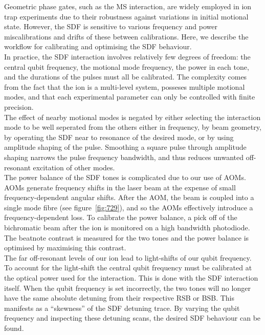     Geometric phase gates, such as the MS interaction, are widely employed in ion trap experiments due to their robustness against variations in initial motional state. However, the SDF is sensitive to various frequency and power miscalibrations and drifts of these between calibrations.  Here, we describe the workflow for calibrating and optimising the SDF behaviour.\\
    In practice, the SDF interaction involves relatively few degrees of freedom: the central qubit frequency, the motional mode frequency, the power in each tone, and the durations of the pulses must all be calibrated. The complexity comes from the fact that the ion is a multi-level system, posseses multiple motional modes, and that each experimental parameter can only be controlled with finite precision.\\
    The effect of nearby motional modes is negated by either selecting the
    interaction mode to be well seperated from the others either in frequency, by beam geometry, by
    operating the SDF near to resonance of the desired mode, or by using amplitude shaping of the pulse.
    Smoothing a square pulse through amplitude shaping narrows the pulse frequency bandwidth, and thus reduces unwanted off-resonant
    excitation of other modes.  \\
    The power balance of the SDF tones is complicated due to our use of AOMs.
    AOMs generate frequency shifts in the laser beam at the expense of small
    frequency-dependent angular shifts. After the AOM, the beam is coupled into a
    single mode fibre (see figure~\ref{fig:729}), and so the AOMs effectively introduce a
    frequency-dependent loss. To calibrate the power balance, a pick
    off of the bichromatic beam after the ion is monitored on a high bandwidth photodiode.
    The beatnote contrast is measured for the two tones and the power
    balance is optimised by maximising this contrast.\\
    The far off-resonant levels of our ion lead to light-shifts of our qubit
    frequency. To account for the light-shift the central qubit frequency must be calibrated at the
    optical power used for the interaction. This is done with the SDF interaction
    itself. When the qubit frequency is set incorrectly, the two tones will no
    longer have the same absolute detuning from their respective RSB or BSB.
    This manifests as a ``skewness'' of the SDF detuning trace. By varying the qubit frequency and
    inspecting these detuning scans, the desired SDF behaviour can be found. \\
